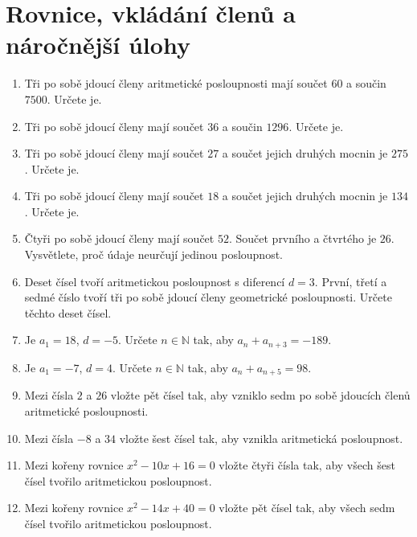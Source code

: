 \documentclass[11pt,a4paper]{article}
\begin{document}
\section*{Rovnice, vkládání členů a náročnější úlohy}

\begin{enumerate}[resume]
    \item Tři po sobě jdoucí členy aritmetické posloupnosti mají součet $60$ a součin $7500$. Určete je.

    \item Tři po sobě jdoucí členy mají součet $36$ a součin $1296$. Určete je.

    \item Tři po sobě jdoucí členy mají součet $27$ a součet jejich druhých mocnin je $275$. Určete je.

    \item Tři po sobě jdoucí členy mají součet $18$ a součet jejich druhých mocnin je $134$. Určete je.

    \item Čtyři po sobě jdoucí členy mají součet $52$. Součet prvního a čtvrtého je $26$. Vysvětlete, proč údaje neurčují jedinou posloupnost.

    \item Deset čísel tvoří aritmetickou posloupnost s diferencí $d=3$. První, třetí a sedmé číslo tvoří tři po sobě jdoucí členy geometrické posloupnosti. Určete těchto deset čísel.

    \item Je $a_1=18$, $d=-5$. Určete $n\in\mathbb{N}$ tak, aby $a_n+a_{n+3}=-189$.

    \item Je $a_1=-7$, $d=4$. Určete $n\in\mathbb{N}$ tak, aby $a_n+a_{n+5}=98$.

    \item Mezi čísla $2$ a $26$ vložte pět čísel tak, aby vzniklo sedm po sobě jdoucích členů aritmetické posloupnosti.

    \item Mezi čísla $-8$ a $34$ vložte šest čísel tak, aby vznikla aritmetická posloupnost.

    \item Mezi kořeny rovnice $x^2-10x+16=0$ vložte čtyři čísla tak, aby všech šest čísel tvořilo aritmetickou posloupnost.

    \item Mezi kořeny rovnice $x^2-14x+40=0$ vložte pět čísel tak, aby všech sedm čísel tvořilo aritmetickou posloupnost.


\end{enumerate}
\end{document}
